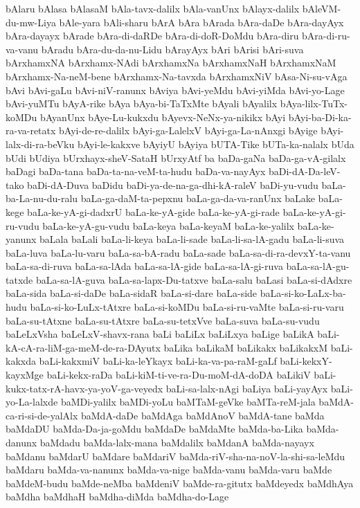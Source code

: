 {bAlaru
bAlasa
bAlasaM
bAla-tavx-dalilx
bAla-vanUnx
bAlayx-dalilx
bAleVM-du-mw-Liya
bAle-yara
bAli-sharu
bArA
bAra
bArada
bAra-daDe
bAra-dayAyx
bAra-dayayx
bArade
bAra-di-daRDe
bAra-di-doR-DoMdu
bAra-diru
bAra-di-ru-va-vanu
bAradu
bAra-du-da-nu-Lidu
bArayAyx
bAri
bArisi
bAri-suva
bArxhamxNA
bArxhamx-NAdi
bArxhamxNa
bArxhamxNaH
bArxhamxNaM
bArxhamx-Na-neM-bene
bArxhamx-Na-tavxda
bArxhamxNiV
bAsa-Ni-su-vAga
bAvi
bAvi-gaLu
bAvi-niV-ranunx
bAviya
bAvi-yeMdu
bAvi-yiMda
bAvi-yo-Lage
bAvi-yuMTu
bAyA-rike
bAya
bAya-bi-TaTxMte
bAyali
bAyalilx
bAya-lilx-TuTx-koMDu
bAyanUnx
bAye-Lu-kukxdu
bAyevx-NeNx-ya-nikikx
bAyi
bAyi-ba-Di-ka-ra-va-retatx
bAyi-de-re-dalilx
bAyi-ga-LalelxV
bAyi-ga-La-nAnxgi
bAyige
bAyi-lalx-di-ra-beVku
bAyi-le-kakxve
bAyiyU
bAyiya
bUTA-Tike
bUTa-ka-nalalx
bUda
bUdi
bUdiya
bUrxhayx-sheV-SataH
bUrxyAtf
ba
baDa-gaNa
baDa-ga-vA-gilalx
baDagi
baDa-tana
baDa-ta-na-veM-ta-hudu
baDa-va-nayAyx
baDi-dA-Da-leV-tako
baDi-dA-Duva
baDidu
baDi-ya-de-na-ga-dhi-kA-raleV
baDi-yu-vudu
baLa-ba-La-nu-du-ralu
baLa-ga-daM-ta-pepxnu
baLa-ga-da-va-ranUnx
baLake
baLa-kege
baLa-ke-yA-gi-dadxrU
baLa-ke-yA-gide
baLa-ke-yA-gi-rade
baLa-ke-yA-gi-ru-vudu
baLa-ke-yA-gu-vudu
baLa-keya
baLa-keyaM
baLa-ke-yalilx
baLa-ke-yanunx
baLala
baLali
baLa-li-keya
baLa-li-sade
baLa-li-sa-lA-gadu
baLa-li-suva
baLa-luva
baLa-lu-varu
baLa-sa-bA-radu
baLa-sade
baLa-sa-di-ra-devxY-ta-vanu
baLa-sa-di-ruva
baLa-sa-lAda
baLa-sa-lA-gide
baLa-sa-lA-gi-ruva
baLa-sa-lA-gu-tatxde
baLa-sa-lA-guva
baLa-sa-lapx-Du-tatxve
baLa-salu
baLasi
baLa-si-dAdxre
baLa-sida
baLa-si-daDe
baLa-sidaR
baLa-si-dare
baLa-side
baLa-si-ko-LaLx-ba-hudu
baLa-si-ko-LuLx-tAtxre
baLa-si-koMDu
baLa-si-ru-vaMte
baLa-si-ru-varu
baLa-su-tAtxne
baLa-su-tAtxre
baLa-su-tetxVve
baLa-suva
baLa-su-vudu
baLeLxVsha
baLeLxV-shavx-rana
baLi
baLiLx
baLiLxya
baLige
baLikA
baLi-kA-cA-ra-liM-ga-meM-de-ra-DAyutx
baLika
baLikaM
baLikakx
baLikakxM
baLi-kakxda
baLi-kakxmiV
baLi-ka-leYkayx
baLi-ka-va-pa-raM-gaLf
baLi-kekxY-kayxMge
baLi-kekx-raDa
baLi-kiM-ti-ve-ra-Du-moM-dA-doDA
baLikiV
baLi-kukx-tatx-rA-havx-ya-yoV-ga-veyedx
baLi-sa-lalx-nAgi
baLiya
baLi-yayAyx
baLi-yo-La-lalxde
baMDi-yalilx
baMDi-yoLu
baMTaM-geVke
baMTa-reM-jala
baMdA-ca-ri-si-de-yalAlx
baMdA-daDe
baMdAga
baMdAnoV
baMdA-tane
baMda
baMdaDU
baMda-Da-ja-goMdu
baMdaDe
baMdaMte
baMda-ba-Lika
baMda-danunx
baMdadu
baMda-lalx-mana
baMdalilx
baMdanA
baMda-nayayx
baMdanu
baMdarU
baMdare
baMdariV
baMda-riV-sha-na-noV-la-shi-sa-leMdu
baMdaru
baMda-va-nanunx
baMda-va-nige
baMda-vanu
baMda-varu
baMde
baMdeM-budu
baMde-neMba
baMdeniV
baMde-ra-gitutx
baMdeyedx
baMdhAya
baMdha
baMdhaH
baMdha-diMda
baMdha-do-Lage
}
